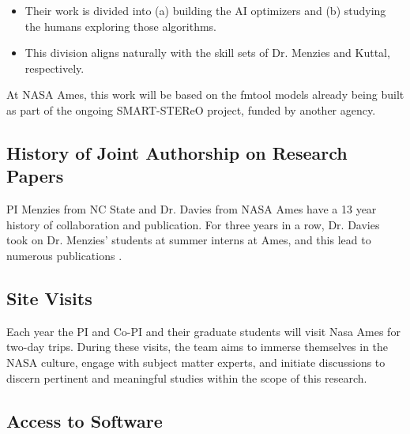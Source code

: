 \documentclass[twoside]{NSF}
\newenvironment{myitemize}
{ \begin{itemize}[topsep=0pt,itemsep=0pt,leftmargin=*]
    \setlength{\itemsep}{0pt}
    \setlength{\parskip}{0pt}
    \setlength{\parsep}{0pt}     }
{ \end{itemize}                  }
\newcommand{\bi}{\begin{myitemize}}
\newcommand{\ei}{\end{myitemize}}
\begin{document}
\bi
\item Their work is divided into (a) building the AI optimizers and (b) studying the humans exploring those algorithms.
\item This division aligns naturally with the skill sets of Dr. Menzies and Kuttal, respectively.
\ei



At NASA Ames, this work will be based on the fmtool models already being built as part of the ongoing SMART-STEReO project, funded by another agency.


\subsection*{History of Joint Authorship on Research Papers}
 PI Menzies from NC State and Dr. Davies
from NASA Ames have a 13 year history of collaboration and 
publication. For three years in a row, Dr. Davies  took on Dr. Menzies' students at summer interns at Ames, and this lead to numerous publications \cite{gay2010automatically,krall2014learning, ttKrallMD15}. %

 
\subsection*{Site Visits}
Each year 
 the PI and Co-PI and their graduate students will   visit Nasa Ames
for two-day trips. During these visits, the team aims to immerse themselves in the NASA culture, engage with subject matter experts, and initiate discussions to discern pertinent and meaningful studies within the scope of this research.

\subsection*{Access to Software}
\end{document}

